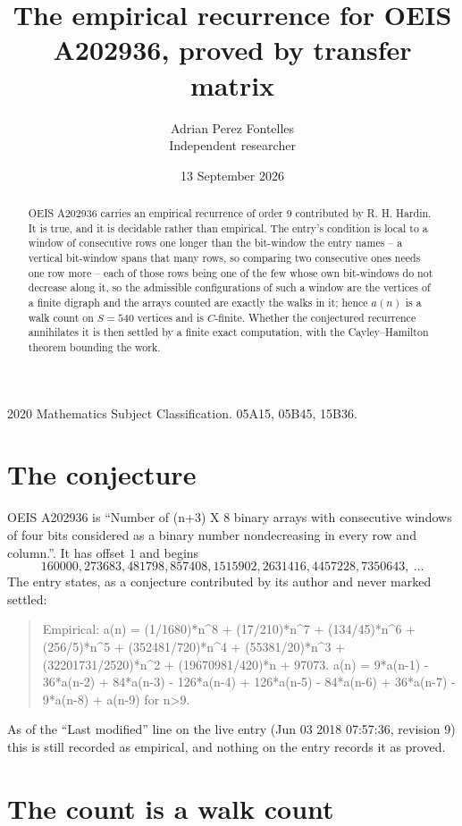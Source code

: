 \documentclass[11pt,a4paper]{article}
\title{The empirical recurrence for OEIS A202936, proved by transfer matrix}
\author{Adrian Perez Fontelles\\ \small Independent researcher}
\date{13 September 2026}
\theoremstyle{plain}
\theoremstyle{definition}
\begin{document}
\maketitle

\begin{abstract}
OEIS A202936 carries an empirical recurrence of order $9$ contributed by R. H. Hardin. It is
true, and it is decidable rather than empirical. The entry's condition is local to a window of consecutive rows one longer than the bit-window the entry names -- a vertical bit-window spans that many rows, so comparing two consecutive ones needs one row more -- each of those rows being one of the few whose own bit-windows do not decrease along it, so
the admissible configurations of such a window are the vertices of a finite digraph and the
arrays counted are exactly the walks in it; hence $a(n)$ is a walk count on $S=540$ vertices
and is $C$-finite. Whether the conjectured recurrence annihilates it is then settled by a
finite exact computation, with the Cayley--Hamilton theorem bounding the work.
\end{abstract}

\noindent\small 2020 Mathematics Subject Classification. 05A15, 05B45, 15B36.\normalsize

\section{The conjecture}

OEIS A202936 is ``Number of (n+3) X 8 binary arrays with consecutive windows of four bits considered as a binary number nondecreasing in every row and column.''. It has offset $1$ and begins
\[
160000, 273683, 481798, 857408, 1515902, 2631416, 4457228, 7350643,\ \dots
\]
The entry states, as a conjecture contributed by its author and never marked settled:
\begin{quote}
Empirical: a(n) = (1/1680)*n\^{}8 + (17/210)*n\^{}7 + (134/45)*n\^{}6 + (256/5)*n\^{}5 + (352481/720)*n\^{}4 + (55381/20)*n\^{}3 + (32201731/2520)*n\^{}2 + (19670981/420)*n + 97073. a(n) = 9*a(n-1) - 36*a(n-2) + 84*a(n-3) - 126*a(n-4) + 126*a(n-5) - 84*a(n-6) + 36*a(n-7) - 9*a(n-8) + a(n-9) for n>9.
\end{quote}
As of the ``Last modified'' line on the live entry (Jun 03 2018 07:57:36, revision 9) this is still
recorded as empirical, and nothing on the entry records it as proved.

\section{The count is a walk count}
\end{document}
